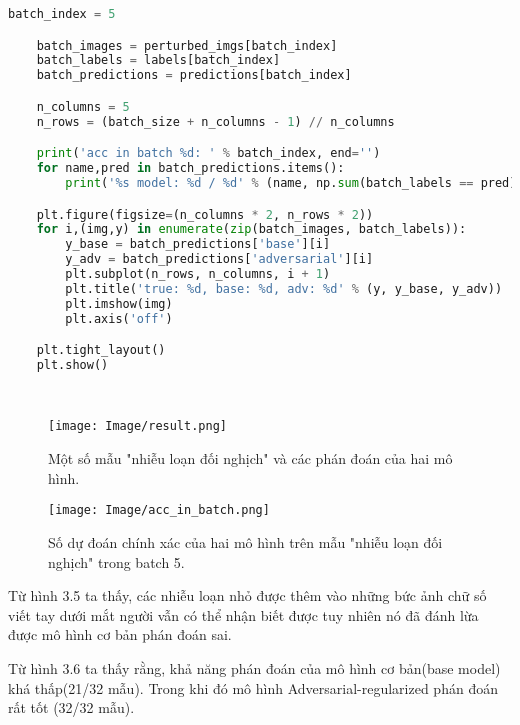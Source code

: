 \begin{lstlisting}[language = Python]
    batch_index = 5

    batch_images = perturbed_imgs[batch_index]
    batch_labels = labels[batch_index]
    batch_predictions = predictions[batch_index]

    n_columns = 5
    n_rows = (batch_size + n_columns - 1) // n_columns

    print('acc in batch %d: ' % batch_index, end='')
    for name,pred in batch_predictions.items():
        print('%s model: %d / %d' % (name, np.sum(batch_labels == pred), batch_size))

    plt.figure(figsize=(n_columns * 2, n_rows * 2))
    for i,(img,y) in enumerate(zip(batch_images, batch_labels)):
        y_base = batch_predictions['base'][i]
        y_adv = batch_predictions['adversarial'][i]
        plt.subplot(n_rows, n_columns, i + 1)
        plt.title('true: %d, base: %d, adv: %d' % (y, y_base, y_adv))
        plt.imshow(img)
        plt.axis('off')

    plt.tight_layout()
    plt.show()

    
\end{lstlisting}

\begin{figure}[h!]
    \centering
    \texttt{[image: Image/result.png]}
    \caption{Một số mẫu "nhiễu loạn đối nghịch" và các phán đoán của hai mô hình.}
    \label{fig 3.5:Một số mẫu "nhiễu loạn đối nghịch" và các phán đoán của hai mô hình.}
    
\end{figure}

\begin{figure}[h!]
    \centering
    \texttt{[image: Image/acc\_in\_batch.png]}
    \caption{Số dự đoán chính xác của hai mô hình trên mẫu "nhiễu loạn đối nghịch" trong batch 5.}
    \label{fig 3.6:Số dự đoán chính xác của hai mô hình trên mẫu "nhiễu loạn đối nghich trong batch 5.}
    
\end{figure}

Từ hình 3.5 ta thấy, các nhiễu loạn nhỏ được thêm vào những bức ảnh chữ số viết tay dưới mắt người vẫn có thể nhận biết được
tuy nhiên nó đã đánh lừa được mô hình cơ bản phán đoán sai.

Từ hình 3.6 ta thấy rằng, khả năng phán đoán của mô hình cơ bản(base model) khá thấp(21/32 mẫu). Trong khi đó
mô hình Adversarial-regularized phán đoán rất tốt (32/32 mẫu).


